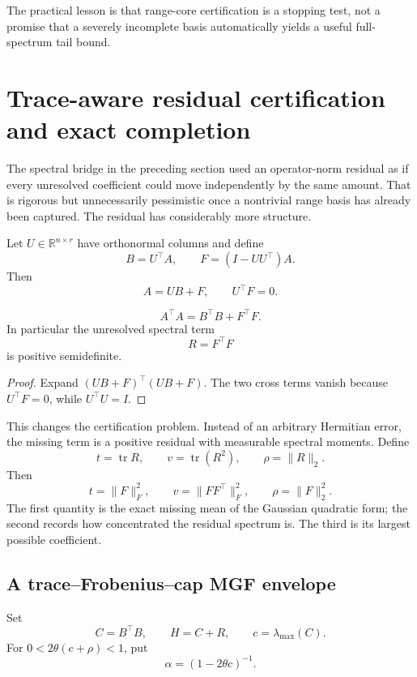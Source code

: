 The practical lesson is that range-core certification is a stopping test, not
a promise that a severely incomplete basis automatically yields a useful
full-spectrum tail bound.



\section{Trace-aware residual certification and exact completion}\label{sec:final-23}

The spectral bridge in the preceding section used an operator-norm residual as
if every unresolved coefficient could move independently by the same amount.
That is rigorous but unnecessarily pessimistic once a nontrivial range basis
has already been captured.  The residual has considerably more structure.

Let \(U\in\mathbb R^{n\times r}\) have orthonormal columns and define
\[
B=U^\top A,
\qquad
F=(I-UU^\top)A.
\]
Then
\[
A=UB+F,
\qquad
U^\top F=0.
\]

\begin{theorem}\label{claim:final-23-1}
\[
\boxed{
A^\top A
=
B^\top B+F^\top F.
}
\]
In particular the unresolved spectral term
\[
R=F^\top F
\]
is positive semidefinite.
\end{theorem}

\begin{proof}
Expand \((UB+F)^\top(UB+F)\).  The two cross terms vanish because
\(U^\top F=0\), while \(U^\top U=I\).
\end{proof}

This changes the certification problem.  Instead of an arbitrary Hermitian
error, the missing term is a positive residual with measurable spectral
moments.  Define
\[
t=\operatorname{tr}R,
\qquad
v=\operatorname{tr}(R^2),
\qquad
\rho=\|R\|_2.
\]
Then
\[
\boxed{
 t=\|F\|_F^2,
 \qquad
 v=\|FF^\top\|_F^2,
 \qquad
 \rho=\|F\|_2^2.
}
\]
The first quantity is the exact missing mean of the Gaussian quadratic form;
the second records how concentrated the residual spectrum is. The third is its
largest possible coefficient.

\subsection{A trace--Frobenius--cap MGF envelope}

Set
\[
C=B^\top B,
\qquad
H=C+R,
\qquad
c=\lambda_{\max}(C).
\]
For \(0<2\theta(c+\rho)<1\), put
\[
\alpha=(1-2\theta c)^{-1}.
\]

